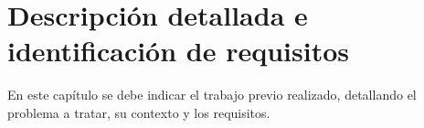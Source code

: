 \chapter{Descripción detallada e identificación de requisitos}

En este capítulo se debe indicar el trabajo previo realizado, detallando el problema a tratar, su contexto y los requisitos.